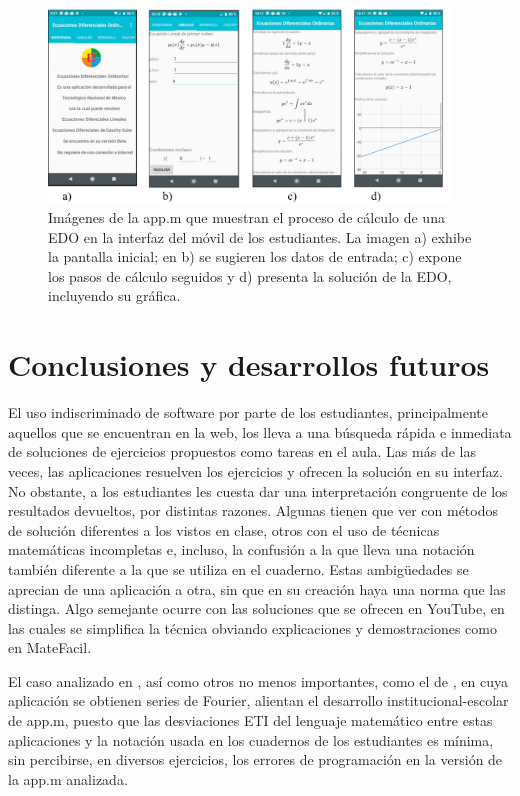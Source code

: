 \documentclass[spanish]{textolivre}
\begin{document}
\begin{figure}[htbp]
 \centering
 \includegraphics[width=0.95\textwidth]{fig2-35052.png}
 \caption{Imágenes de la app.m que muestran el proceso de cálculo de una EDO en la interfaz del móvil de los estudiantes. La imagen a) exhibe la pantalla inicial; en b) se sugieren los datos de entrada; c) expone los pasos de cálculo seguidos y d) presenta la solución de la EDO, incluyendo su gráfica.}
 \label{fig2}
\end{figure}

\section{Conclusiones y desarrollos futuros}
El uso indiscriminado de software por parte de los estudiantes, principalmente aquellos que se encuentran en la web, los lleva a una búsqueda rápida e inmediata de soluciones de ejercicios propuestos como tareas en el aula. Las más de las veces, las aplicaciones resuelven los ejercicios y ofrecen la solución en su interfaz. No obstante, a los estudiantes les cuesta dar una interpretación congruente de los resultados devueltos, por distintas razones. Algunas tienen que ver con métodos de solución diferentes a los vistos en clase, otros con el uso de técnicas matemáticas incompletas e, incluso, la confusión a la que lleva una notación también diferente a la que se utiliza en el cuaderno. Estas ambigüedades se aprecian de una aplicación a otra, sin que en su creación haya una norma que las distinga. Algo semejante ocurre con las soluciones que se ofrecen en YouTube, en las cuales se simplifica la técnica obviando explicaciones y demostraciones como en MateFacil.

El caso analizado en \textcite{garcia2020}, así como otros no menos importantes, como el de \textcite{duarte2020}, en cuya aplicación se obtienen series de Fourier, alientan el desarrollo institucional-escolar de app.m, puesto que las desviaciones ETI del lenguaje matemático entre estas aplicaciones y la notación usada en los cuadernos de los estudiantes es mínima, sin percibirse, en diversos ejercicios, los errores de programación en la versión de la app.m analizada.
\end{document}

